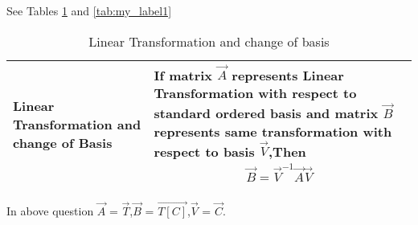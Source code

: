 See Tables \ref{tab:my_label}
and     \ref{tab:my_label1}

\begin{table}[h!]
\begin{center}
\begin{tabular}{|m{2cm}|m{6cm}|}\hline
        Linear Transformation and change of Basis & If matrix $\vec{A}$ represents Linear Transformation with respect to standard ordered basis and matrix $\vec{B}$ represents same transformation with respect to basis $\vec{V}$,Then{\begin{align*}
            \vec{B} = \vec{V}^{-1}\vec{A}\vec{V}
        \end{align*}}\\
        \hline
\end{tabular}
\end{center}
\caption{Linear Transformation and change of basis}
\label{tab:my_label}
\end{table}
In above question $\vec{A}$ = $\vec{T}$,$\vec{B}$ = $\vec{T[C]}$,$\vec{V}$ = $\vec{C}$.
